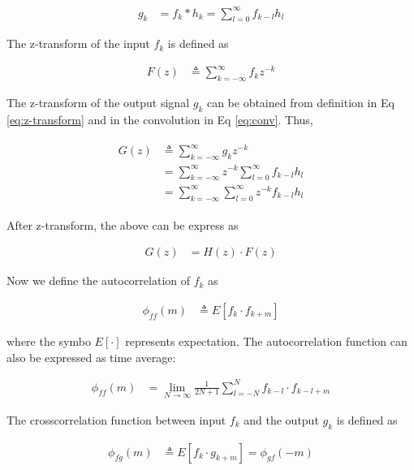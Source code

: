 \documentclass[8pt,a4paper]{article}
\begin{document}
\begin{multicols}{2}
\begin{align}
\label{eq:conv}
  g_{k} &= f_{k} * h_{k} 
        = \sum_{l=0}^{\infty} f_{k-l}h_{l} 
\end{align}

The z-transform of the input $f_{k}$ is defined as

\begin{align}
  \label{eq:z-transform}
  F(z)&\triangleq \sum_{k=-\infty}^{\infty} f_{k}z^{-k}
\end{align}

The z-transform of the output signal $g_{k}$ can be obtained from definition in Eq \ref{eq:z-transform} and in the convolution in Eq \ref{eq:conv}. Thus, 

\begin{align}
  \begin{split}
  G(z)&\triangleq \sum_{k=-\infty}^{\infty} g_{k}z^{-k}\\
      &=\sum_{k=-\infty}^{\infty} z^{-k} \sum_{l=0}^{\infty} f_{k-l}h_{l} \\
      &=\sum_{k=-\infty}^{\infty} \sum_{l=0}^{\infty} z^{-k}f_{k-l}h_{l}
  \end{split}
\end{align}

After z-transform, the above can be express as

\begin{align}
  G(z) &= H(z) \cdot F(z)
\end{align}

Now we define the autocorrelation of $f_{k}$ as

\begin{align}
  \phi_{ff}(m) &\triangleq E \left[ f_{k} \cdot f_{k+m} \right]
\end{align}

where the symbo $E[\cdot]$ represents expectation. The autocorrelation function can also be expressed as time average:

\begin{align}
  \phi_{ff}(m) &= \lim_{N\rightarrow\infty} \frac{1}{2N+1} \sum_{l=-N}^{N} f_{k-l} \cdot f_{k-l+m}
\end{align}

The crosscorrelation function between input $f_{k}$ and the output $g_{k}$ is defined as

\begin{align}
  \phi_{fg}(m) &\triangleq E \left[ f_{k} \cdot g_{k+m} \right] = \phi_{gf}(-m)
\end{align}


\end{multicols}
\end{document}

